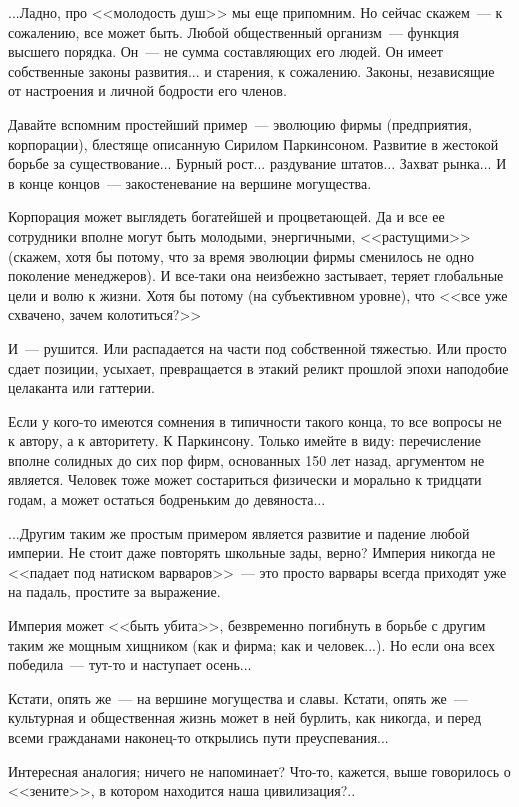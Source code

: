 \documentclass{scrbook}
\newcommand{\flqq}{<<}
\newcommand{\frqq}{>>}
\newcommand{\mdash}{~--- }
\begin{document}
...Ладно, про {\flqq}молодость душ{\frqq} мы еще припомним. Но сейчас скажем{\mdash}к сожалению, все может быть. Любой общественный организм{\mdash}функция высшего порядка. Он{\mdash}не сумма составляющих его людей. Он имеет собственные законы развития... и старения, к сожалению. Законы, независящие от настроения и личной бодрости его членов.

Давайте вспомним простейший пример{\mdash}эволюцию фирмы (предприятия, корпорации), блестяще описанную Сирилом Паркинсоном. Развитие в жестокой борьбе за существование... Бурный рост... раздувание штатов... Захват рынка... И в конце концов{\mdash}закостеневание на вершине могущества.

Корпорация может выглядеть богатейшей и процветающей. Да и все ее сотрудники вполне могут быть молодыми, энергичными, {\flqq}растущими{\frqq} (скажем, хотя бы потому, что за время эволюции фирмы сменилось не одно поколение менеджеров). И все-таки она неизбежно застывает, теряет глобальные цели и волю к жизни. Хотя бы потому (на субъективном уровне), что {\flqq}все уже схвачено, зачем колотиться?{\frqq}

И{\mdash}рушится. Или распадается на части под собственной тяжестью. Или просто сдает позиции, усыхает, превращается в этакий реликт прошлой эпохи наподобие целаканта или гаттерии.

Если у кого-то имеются сомнения в типичности такого конца, то все вопросы не к автору, а к авторитету. К Паркинсону. Только имейте в виду: перечисление вполне солидных до сих пор фирм, основанных 150 лет назад, аргументом не является. Человек тоже может состариться физически и морально к тридцати годам, а может остаться бодреньким до девяноста...

...Другим таким же простым примером является развитие и падение любой империи. Не стоит даже повторять школьные зады, верно? Империя никогда не {\flqq}падает под натиском варваров{\frqq}{\mdash}это просто варвары всегда приходят уже на падаль, простите за выражение.

Империя может {\flqq}быть убита{\frqq}, безвременно погибнуть в борьбе с другим таким же мощным хищником (как и фирма; как и человек...). Но если она всех победила{\mdash}тут-то и наступает осень...

Кстати, опять же{\mdash}на вершине могущества и славы. Кстати, опять же{\mdash}культурная и общественная жизнь может в ней бурлить, как никогда, и перед всеми гражданами наконец-то открылись пути преуспевания...

Интересная аналогия; ничего не напоминает? Что-то, кажется, выше говорилось о {\flqq}зените{\frqq}, в котором находится наша цивилизация?..
\end{document}
